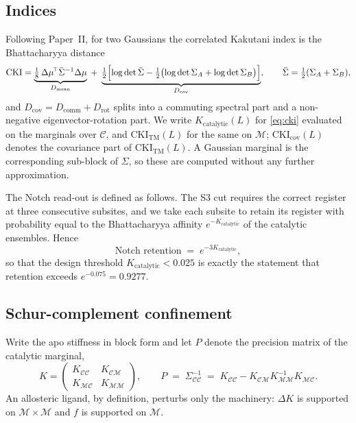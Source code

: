 \documentclass[11pt,reqno]{amsart}
\theoremstyle{plain}
\theoremstyle{definition}
\theoremstyle{remark}
\numberwithin{equation}{section}
\newcommand{\CKI}{\mathrm{CKI}}
\newcommand{\Kcat}{K_{\mathrm{catalytic}}}
\newcommand{\CKItm}{\CKI_{\mathrm{TM}}}
\newcommand{\CKIcov}{\CKI_{\mathrm{cov}}}
\newcommand{\CC}{\mathcal{C}}
\newcommand{\MM}{\mathcal{M}}
\begin{document}
\subsection{Indices}
Following Paper~II, for two Gaussians the correlated Kakutani index is the Bhattacharyya distance
\begin{equation}
\label{eq:cki}
\CKI = \underbrace{\tfrac18\,\Delta\mu^{\!\top}\bar\Sigma^{-1}\Delta\mu}_{D_{\mathrm{mean}}}
\;+\;\underbrace{\tfrac12\Bigl[\log\det\bar\Sigma-\tfrac12\bigl(\log\det\Sigma_A+\log\det\Sigma_B\bigr)\Bigr]}_{D_{\mathrm{cov}}},
\qquad \bar\Sigma=\tfrac12(\Sigma_A+\Sigma_B),
\end{equation}
and $D_{\mathrm{cov}}=D_{\mathrm{comm}}+D_{\mathrm{rot}}$ splits into a commuting spectral part and a non-negative eigenvector-rotation part. We write $\Kcat(L)$ for \eqref{eq:cki} evaluated on the marginals over $\CC$, and $\CKItm(L)$ for the same on $\MM$; $\CKIcov(L)$ denotes the covariance part of $\CKItm(L)$. A Gaussian marginal is the corresponding sub-block of $\Sigma$, so these are computed without any further approximation.

The Notch read-out is defined as follows. The S3 cut requires the correct register at three consecutive subsites, and we take each subsite to retain its register with probability equal to the Bhattacharyya affinity $e^{-\Kcat}$ of the catalytic ensembles. Hence
\begin{equation}
\label{eq:notch}
\text{Notch retention} \;=\; e^{-3\Kcat},
\end{equation}
so that the design threshold $\Kcat<0.025$ is exactly the statement that retention exceeds $e^{-0.075}=0.9277$.

\subsection{Schur-complement confinement}
Write the apo stiffness in block form and let $P$ denote the precision matrix of the catalytic marginal,
\begin{equation}
\label{eq:schur}
K=\begin{pmatrix}K_{\CC\CC} & K_{\CC\MM}\\ K_{\MM\CC} & K_{\MM\MM}\end{pmatrix},
\qquad
P \;=\; \Sigma_{\CC\CC}^{-1} \;=\; K_{\CC\CC}-K_{\CC\MM}K_{\MM\MM}^{-1}K_{\MM\CC}.
\end{equation}
An allosteric ligand, by definition, perturbs only the machinery: $\Delta K$ is supported on $\MM\times\MM$ and $f$ is supported on $\MM$.
\end{document}
